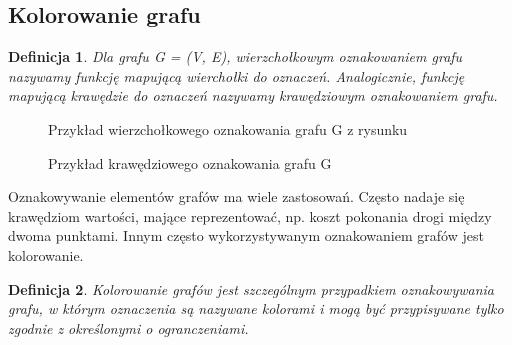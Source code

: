 \documentclass[11pt]{article}
\newtheorem{definition}{Definicja}[section]
\begin{document}
    \subsection{Kolorowanie grafu}
    \begin{definition}
      Dla grafu G = (V, E), wierzchołkowym oznakowaniem grafu nazywamy funkcję
       mapującą wierchołki do oznaczeń. Analogicznie, funkcję mapującą krawędzie do oznaczeń 
       nazywamy krawędziowym oznakowaniem grafu.  
    \end{definition}


    \begin{figure}[H]
      \centering
        \caption{ Przykład wierzchołkowego oznakowania grafu G z rysunku }
     \end{figure}

     \begin{figure}[H]
      \centering
        \caption{ Przykład krawędziowego oznakowania grafu G }
     \end{figure}

     Oznakowywanie elementów grafów ma wiele zastosowań. Często nadaje się krawędziom wartości, mające reprezentować, np.
     koszt pokonania drogi między dwoma punktami. Innym często wykorzystywanym oznakowaniem grafów jest kolorowanie.   
   
    \begin{definition}
      Kolorowanie grafów jest szczególnym przypadkiem oznakowywania grafu,
       w którym oznaczenia są nazywane kolorami i mogą być przypisywane tylko zgodnie z określonymi o
       ogranczeniami. 
    \end{definition}
\end{document}
